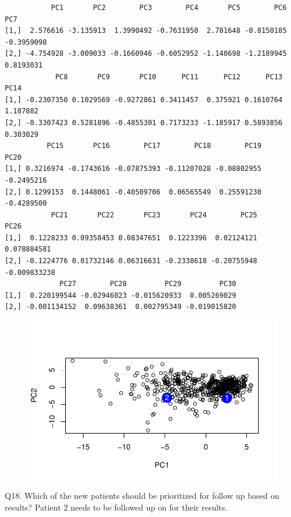 \documentclass[
  letterpaper,
  DIV=11,
  numbers=noendperiod]{scrartcl}
\newenvironment{Shaded}{\begin{snugshade}}{\end{snugshade}}
\newcommand{\AttributeTok}[1]{\textcolor[rgb]{0.40,0.45,0.13}{#1}}
\newcommand{\DecValTok}[1]{\textcolor[rgb]{0.68,0.00,0.00}{#1}}
\newcommand{\FunctionTok}[1]{\textcolor[rgb]{0.28,0.35,0.67}{#1}}
\newcommand{\NormalTok}[1]{\textcolor[rgb]{0.00,0.23,0.31}{#1}}
\newcommand{\SpecialCharTok}[1]{\textcolor[rgb]{0.37,0.37,0.37}{#1}}
\newcommand{\StringTok}[1]{\textcolor[rgb]{0.13,0.47,0.30}{#1}}
\begin{document}
\begin{verbatim}
           PC1       PC2        PC3        PC4       PC5        PC6        PC7
[1,]  2.576616 -3.135913  1.3990492 -0.7631950  2.781648 -0.8150185 -0.3959098
[2,] -4.754928 -3.009033 -0.1660946 -0.6052952 -1.140698 -1.2189945  0.8193031
            PC8       PC9       PC10      PC11      PC12      PC13     PC14
[1,] -0.2307350 0.1029569 -0.9272861 0.3411457  0.375921 0.1610764 1.187882
[2,] -0.3307423 0.5281896 -0.4855301 0.7173233 -1.185917 0.5893856 0.303029
          PC15       PC16        PC17        PC18        PC19       PC20
[1,] 0.3216974 -0.1743616 -0.07875393 -0.11207028 -0.08802955 -0.2495216
[2,] 0.1299153  0.1448061 -0.40509706  0.06565549  0.25591230 -0.4289500
           PC21       PC22       PC23       PC24        PC25         PC26
[1,]  0.1228233 0.09358453 0.08347651  0.1223396  0.02124121  0.078884581
[2,] -0.1224776 0.01732146 0.06316631 -0.2338618 -0.20755948 -0.009833238
             PC27        PC28         PC29         PC30
[1,]  0.220199544 -0.02946023 -0.015620933  0.005269029
[2,] -0.001134152  0.09638361  0.002795349 -0.019015820
\end{verbatim}

\begin{Shaded}
\end{Shaded}

\begin{figure}[H]

{\centering \includegraphics{test_files/figure-pdf/unnamed-chunk-28-1.pdf}

}

\end{figure}

Q18. Which of the new patients should be prioritized for follow up based
on results? Patient 2 needs to be followed up on for their results.
\end{document}

